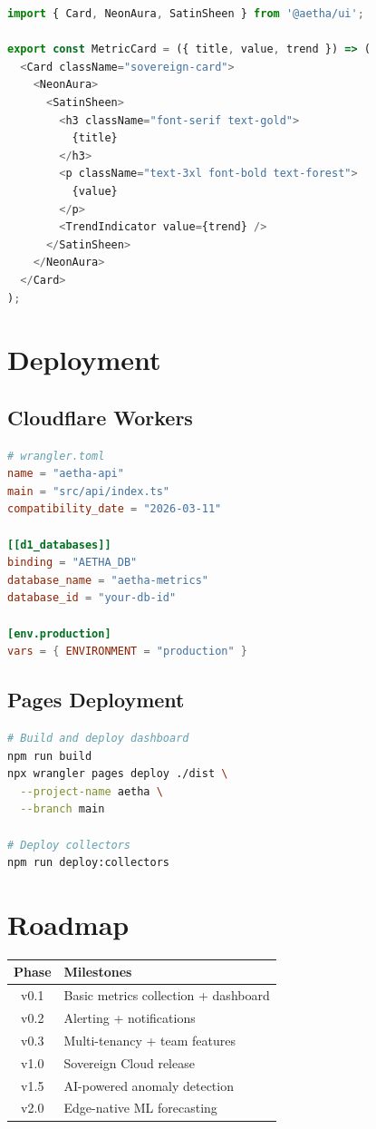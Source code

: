 \documentclass[12pt]{article}
\begin{document}
\begin{lstlisting}[language=typescript]
import { Card, NeonAura, SatinSheen } from '@aetha/ui';

export const MetricCard = ({ title, value, trend }) => (
  <Card className="sovereign-card">
    <NeonAura>
      <SatinSheen>
        <h3 className="font-serif text-gold">
          {title}
        </h3>
        <p className="text-3xl font-bold text-forest">
          {value}
        </p>
        <TrendIndicator value={trend} />
      </SatinSheen>
    </NeonAura>
  </Card>
);
\end{lstlisting}

\section{Deployment}

\subsection{Cloudflare Workers}

\begin{lstlisting}[language=toml]
# wrangler.toml
name = "aetha-api"
main = "src/api/index.ts"
compatibility_date = "2026-03-11"

[[d1_databases]]
binding = "AETHA_DB"
database_name = "aetha-metrics"
database_id = "your-db-id"

[env.production]
vars = { ENVIRONMENT = "production" }
\end{lstlisting}

\subsection{Pages Deployment}

\begin{lstlisting}[language=bash]
# Build and deploy dashboard
npm run build
npx wrangler pages deploy ./dist \
  --project-name aetha \
  --branch main

# Deploy collectors
npm run deploy:collectors
\end{lstlisting}

\section{Roadmap}

\begin{tabular}{|c|l|}
\hline
\textbf{Phase} & \textbf{Milestones} \\
\hline
v0.1 & Basic metrics collection + dashboard \\
v0.2 & Alerting + notifications \\
v0.3 & Multi-tenancy + team features \\
v1.0 & Sovereign Cloud release \\
v1.5 & AI-powered anomaly detection \\
v2.0 & Edge-native ML forecasting \\
\hline
\end{tabular}
\end{document}
